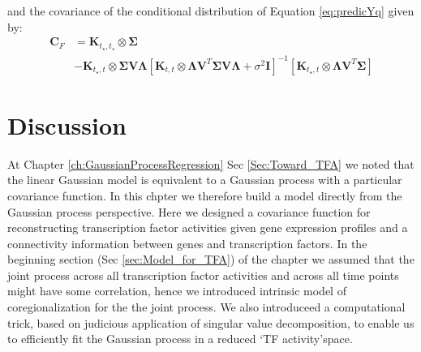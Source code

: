 and the covariance of the conditional distribution of Equation \ref{eq:predicYq} %
given by:
\begin{equation} \label{eq:prediction_CF}
\begin{split}
  \boldsymbol{C}_F &= 
    \mathbf{K}_{t_\star,t_\star} \otimes \boldsymbol{\Sigma} \\
    & - \mathbf{K}_{t_\star,t} \otimes \boldsymbol{\Sigma}\mathbf{V} \boldsymbol{\Lambda}
    \left[ \mathbf{K}_{t,t} \otimes \boldsymbol{\Lambda} \mathbf{V}^T\boldsymbol{\Sigma} \mathbf{V} \boldsymbol{\Lambda} + \sigma^2 \mathbf{I} \right]^{-1} 
    \left[ \mathbf{K}_{t_\star,t} \otimes \boldsymbol{\Lambda} \mathbf{V}^T\boldsymbol{\Sigma}\right]
\end{split}
\end{equation}


\section{Discussion}
At Chapter \ref{ch:GaussianProcessRegression} Sec \ref{Sec:Toward_TFA} we noted that the linear Gaussian model is equivalent to a Gaussian process with a particular covariance function. In this chpter we therefore build a model directly from the Gaussian process perspective. Here we designed a covariance function for reconstructing transcription factor activities given gene expression profiles and a connectivity information between genes and transcription factors. In the beginning section (Sec \ref{sec:Model_for_TFA}) of the chapter we assumed that the joint process across all transcription factor activities and across all time points might have some correlation, hence we introduced intrinsic model of coregionalization for the the joint process. We also introduceed a computational trick, based on  judicious application of singular value decomposition, to enable us to efficiently fit the Gaussian process in a reduced \lq TF activity\rq space. 
